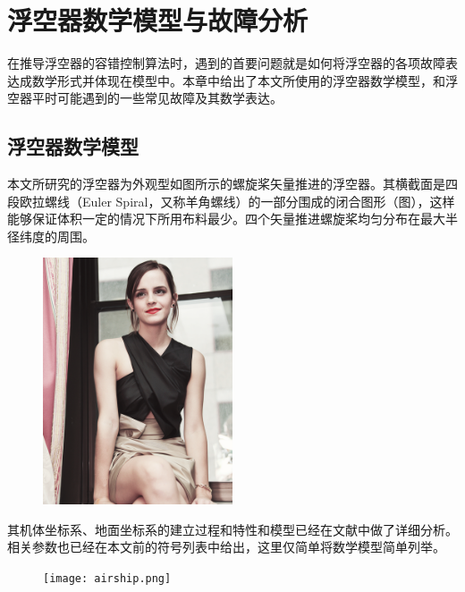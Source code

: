 \chapter{浮空器数学模型与故障分析}\label{chap:preliminary}
在推导浮空器的容错控制算法时，遇到的首要问题就是如何将浮空器的各项故障表达成数学形式并体现在模型中。本章中给出了本文所使用的浮空器数学模型，和浮空器平时可能遇到的一些常见故障及其数学表达。
\section{浮空器数学模型}
本文所研究的浮空器为外观型如图所示的螺旋桨矢量推进的浮空器。其横截面是四段欧拉螺线（Euler Spiral，又称羊角螺线）的一部分围成的闭合图形（图），这样能够保证体积一定的情况下所用布料最少。四个矢量推进螺旋桨均匀分布在最大半径纬度的周围。
\begin{figure}
    \centering
    \includegraphics[width=0.5\textwidth]{figure/placeholder.png}
\end{figure}

其机体坐标系、地面坐标系的建立过程和特性和模型已经在文献中做了详细分析。相关参数也已经在本文前的符号列表中给出，这里仅简单将数学模型简单列举。
\begin{figure}
    \centering
    \texttt{[image: airship.png]}
\end{figure}

